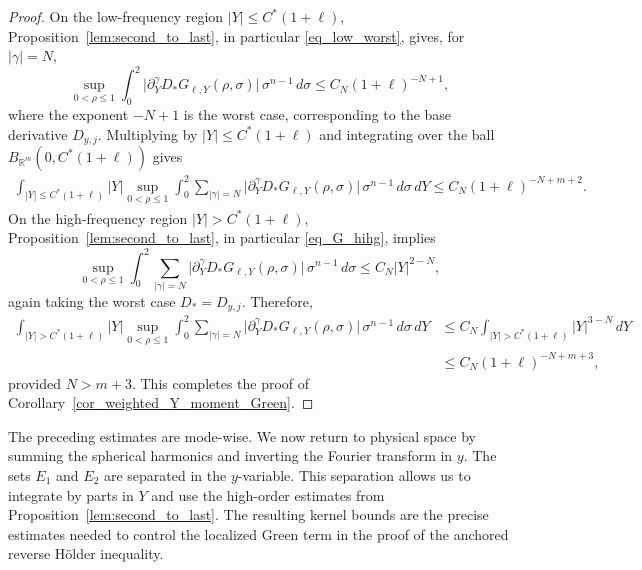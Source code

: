 \documentclass[12pt]{amsart}
\begin{document}
\begin{proof}
On the low-frequency region $|Y|\le C^*(1+\ell)$, Proposition~\ref{lem:second_to_last}, in particular \eqref{eq_low_worst}, gives, for $|\gamma|=N$,
\begin{equation*}
    \sup_{0<\rho\leq1}
    \int_0^2
    \bigl|
        \partial_Y^\gamma D_*G_{\ell,Y}(\rho,\sigma)
    \bigr|
    \,\sigma^{n-1}\,d\sigma
    \leq
    C_N(1+\ell)^{-N+1},
\end{equation*}
where the exponent $-N+1$ is the worst case, corresponding to the base derivative $D_{y,j}$. Multiplying by $|Y|\le C^*(1+\ell)$ and integrating over the ball $B_{\mathbb{R}^m}(0, C^*(1+\ell))$ gives
\begin{align*}
    \int_{|Y|\le C^*(1+\ell)} |Y| \sup_{0<\rho\leq1} \int_0^2 \sum_{|\gamma|=N} \bigl|\partial_Y^\gamma D_*G_{\ell,Y}(\rho,\sigma)\bigr|\,\sigma^{n-1}\,d\sigma\,dY
    \le C_N(1+\ell)^{-N+m+2}.
\end{align*}
On the high-frequency region $|Y|>C^*(1+\ell)$, Proposition~\ref{lem:second_to_last}, in particular \eqref{eq_G_hihg}, implies
\begin{equation*}
    \sup_{0<\rho\le 1}
    \int_0^2
    \sum_{|\gamma|=N}
    \bigl|
        \partial_Y^\gamma D_*G_{\ell,Y}(\rho,\sigma)
    \bigr|
    \,\sigma^{n-1}\,d\sigma
    \le
    C_N |Y|^{2-N},
\end{equation*}
again taking the worst case $D_*=D_{y,j}$. Therefore,
\begin{align*}
    \int_{|Y|>C^*(1+\ell)} |Y| \sup_{0<\rho\leq1} \int_0^2 \sum_{|\gamma|=N}\bigl|\partial_Y^\gamma D_*G_{\ell,Y}(\rho,\sigma)\bigr|\,\sigma^{n-1}\,d\sigma\,dY
    &\le C_N  \int_{|Y|>C^*(1+\ell)} |Y|^{3-N}\,dY\\
    &\le C_N(1+\ell)^{-N+m+3},
\end{align*}
provided $N>m+3$. This completes the proof of Corollary~\ref{cor_weighted_Y_moment_Green}.
\end{proof}







The preceding estimates are mode-wise. We now return to physical space by summing the spherical harmonics and inverting the Fourier transform in $y$. The sets $E_1$ and $E_2$ are separated in the $y$-variable. This separation allows us to integrate by parts in $Y$ and use the high-order estimates from Proposition~\ref{lem:second_to_last}. The resulting kernel bounds are the precise estimates needed to control the localized Green term in the proof of the anchored reverse H\"older inequality.
\end{document}
